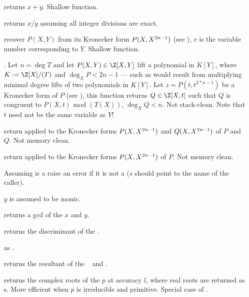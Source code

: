  returns $x+y$. Shallow function.

 returns $x/y$ assuming all integer
divisions are exact.

 recover $P(X,Y)$
from its Kronecker form $P(X,X^{2\*n-1})$ (see ),
$v$ is the variable number corresponding to $Y$. Shallow function.

. Let $n = \deg T$ and let
$P(X,Y)\in \Z[X,Y]$ lift a polynomial in $K[Y]$, where $K := \Z[X]/(T)$ and
$\deg_X P < 2n-1$ --- such as would result from multiplying minimal degree
lifts of two polynomials in $K[Y]$. Let $z = P(t,t^{2*n-1})$ be a Kronecker
form of $P$ (see ), this function returns $Q\in
\Z[X,t]$ such that $Q$ is congruent to $P(X,t)$ mod $(T(X))$, $\deg_X Q <
n$. Not stack-clean. Note that $t$ need not be the same variable as $Y$!

 return 
applied to the Kronecker forms $P(X,X^{2\*n-1})$ and $Q(X,X^{2\*n-1})$
of $P$ and $Q$. Not memory clean.

 return 
applied to the Kronecker forms $P(X,X^{2\*n-1})$
of $P$. Not memory clean.


 Assuming  is a 
raise an error if it is not a  ($s$ should point to the name of the
caller).



 $y$ is assumed to be monic.

 returns a gcd of the  $x$ and $y$.

 returns the discriminant of the 
.

 as .

 returns the resultant of the
~ and .

 returns the complex roots of the
 $p$ at accuracy $l$, where real roots are returned as s.
More efficient when $p$ is irreducible and primitive. Special case
of .

